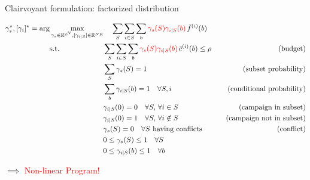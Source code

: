\begin{frame}{Clairvoyant formulation: factorized distribution}
    \vspace{-0.2cm}
    
    \footnotesize\begin{equation*}
        \begin{aligned}
            \gamma_s^\star, [\gamma_i]^\star = \arg & \max_{\gamma_s \in \mathbb{R}^{2^N}, [\gamma_{i|S}] \in \mathbb{R}^{NK}} ~~~ \sum_S \sum_{i \in S} \sum_b \textcolor{red}{\gamma_s(S) \gamma_{i|S}(b)}\, \bar{f}^{(i)}(b) \\
            & \begin{aligned} 
                \text{s.t.} ~~~~~~~~~~~~~~~~~~ & \sum_S \sum_{i \in S} \sum_b \textcolor{red}{\gamma_s(S) \gamma_{i|S}(b)}\, \bar{c}^{(i)}(b) \le \rho \quad & \text{(budget)} \\
                & \sum_S \gamma_s(S) = 1 & \text{(subset probability)} \\
                & \sum_b \gamma_{i|S}(b) = 1 \quad \forall S, i & \text{(conditional probability)} \\
                & \gamma_{i|S}(0) = 0 \quad \forall S,\, \forall i \in S & \text{(campaign in subset)} \\
                & \gamma_{i|S}(0) = 1 \quad \forall S,\, \forall i \notin S & \text{(campaign not in subset)} \\
                & \gamma_s(S) = 0 \quad \forall S \text{ having conflicts} & \text{(conflict)} \\
                & 0 \le \gamma_s(S) \le 1 \quad \forall S \\
                & 0 \le \gamma_{i|S}(b) \le 1 \quad \forall b 
            \end{aligned}
        \end{aligned}
    \end{equation*}

    $\implies$ \textcolor{red}{Non-linear Program!}
\end{frame}

